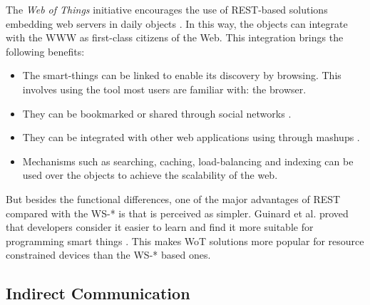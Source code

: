 The \emph{Web of Things} initiative encourages the use of REST-based solutions embedding web servers in daily objects \cite{guinard_internet_2011}.
In this way, the objects can integrate with the WWW as first-class citizens of the Web.
This integration brings the following benefits:
\begin{itemize}
  \item The smart-things can be linked to enable its discovery by browsing. This involves using the tool most users are familiar with: the browser.
  \item They can be bookmarked or shared through social networks \cite{guinard_sharing_2010}.
  \item They can be integrated with other web applications using through mashups \cite{ostermaier_webplug:_2010}. %
  \item Mechanisms such as searching, caching, load-balancing and indexing can be used over the objects to achieve the scalability of the web. %
\end{itemize}


But besides the functional differences, one of the major advantages of REST compared with the WS-* is that is perceived as simpler.
Guinard et al. proved that developers consider it easier to learn and find it more suitable for programming smart things \cite{}.
This makes WoT solutions more popular for resource constrained devices than the WS-* based ones.







\subsection{Indirect Communication}
\label{sec:indirect_communication}

